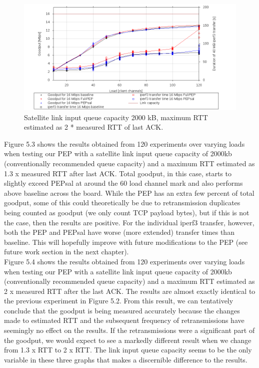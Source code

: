 \begin{figure}[ht!]
    \centering
    \includegraphics[width=1.3\textwidth, angle =270]{2000k-2.png}
    \caption{Satellite link input queue capacity 2000 kB, maximum RTT estimated as 2 * measured RTT of last ACK.}
    \label{fig: 2000k + 2*RTT} 
\end{figure}

Figure 5.3 shows the results obtained from 120 experiments over varying loads when testing our PEP with a satellite link input queue capacity of 2000kb (conventionally recommended queue capacity) and a maximum RTT estimated as 1.3 x measured RTT after last ACK. Total goodput, in this case, starts to slightly exceed PEPsal at around the 60 load channel mark and also performs above baseline across the board. While the PEP has an extra few percent of total goodput, some of this could theoretically be due to retransmission duplicates being counted as goodput (we only count TCP payload bytes), but if this is not the case, then the results are positive. For the individual iperf3 transfer, however, both the PEP and PEPsal have worse (more extended) transfer times than baseline. This will hopefully improve with future modifications to the PEP (see future work section in the next chapter). \\

Figure 5.4 shows the results obtained from 120 experiments over varying loads when testing our PEP with a satellite link input queue capacity of 2000kb (conventionally recommended queue capacity) and a maximum RTT estimated as 2 x measured RTT after the last ACK. The results are almost exactly identical to the previous experiment in Figure 5.2. From this result, we can tentatively conclude that the goodput is being measured accurately because the changes made to estimated RTT and the subsequent frequency of retransmissions have seemingly no effect on the results. If the retransmissions were a significant part of the goodput, we would expect to see a markedly different result when we change from 1.3 x RTT to 2 x RTT. The link input queue capacity seems to be the only variable in these three graphs that makes a discernible difference to the results. 